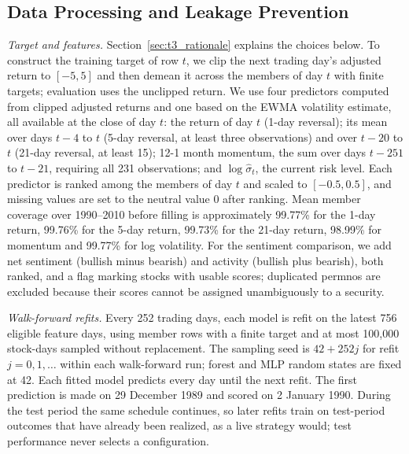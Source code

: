 \documentclass[conference]{IEEEtran}
\begin{document}
\subsection{Data Processing and Leakage Prevention}
\label{sec:t3_processing}

\textit{Target and features.} Section~\ref{sec:t3_rationale} explains the choices below. To construct the training target of row $t$, we clip the next trading day's adjusted return to $[-5,5]$ and then demean it across the members of day $t$ with finite targets; evaluation uses the unclipped return. We use four predictors computed from clipped adjusted returns and one based on the EWMA volatility estimate, all available at the close of day $t$: the return of day $t$ (1-day reversal); its mean over days $t-4$ to $t$ (5-day reversal, at least three observations) and over $t-20$ to $t$ (21-day reversal, at least 15); 12-1 month momentum, the sum over days $t-251$ to $t-21$, requiring all 231 observations; and $\log\hat\sigma_t$, the current risk level. Each predictor is ranked among the members of day $t$ and scaled to $[-0.5,0.5]$, and missing values are set to the neutral value 0 after ranking. Mean member coverage over 1990--2010 before filling is approximately 99.77\% for the 1-day return, 99.76\% for the 5-day return, 99.73\% for the 21-day return, 98.99\% for momentum and 99.77\% for log volatility. For the sentiment comparison, we add net sentiment (bullish minus bearish) and activity (bullish plus bearish), both ranked, and a flag marking stocks with usable scores; duplicated permnos are excluded because their scores cannot be assigned unambiguously to a security.

\textit{Walk-forward refits.} Every 252 trading days, each model is refit on the latest 756 eligible feature days, using member rows with a finite target and at most 100,000 stock-days sampled without replacement. The sampling seed is $42+252j$ for refit $j=0,1,\ldots$ within each walk-forward run; forest and MLP random states are fixed at 42. Each fitted model predicts every day until the next refit. The first prediction is made on 29 December 1989 and scored on 2 January 1990. During the test period the same schedule continues, so later refits train on test-period outcomes that have already been realized, as a live strategy would; test performance never selects a configuration.
\end{document}
